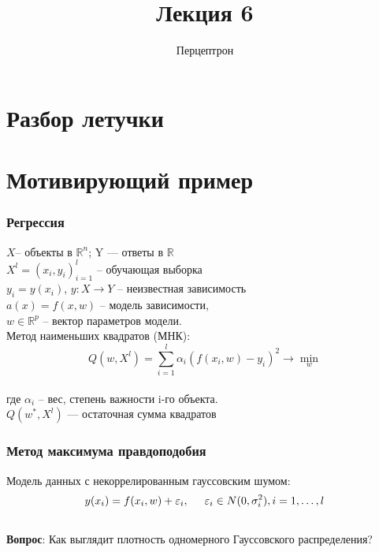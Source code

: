 \documentclass[10pt]{beamer}
\title{Лекция 6}
\subtitle{Перцептрон}
\begin{document}
\maketitle

\section{Разбор летучки}

\section{Мотивирующий пример}

\begin{frame}\frametitle{Регрессия}
$X$-- объекты в $\mathbb{R}^n$; Y — ответы в $\mathbb{R}$\\
$X^l = (x_i, y_i)_{i=1}^l$ -- обучающая выборка\\
$y_i = y(x_i)$,  $y : X \rightarrow Y$ -- неизвестная зависимость\\
\vspace{5mm}
$a(x) = f (x, w)$ -- модель зависимости,\\
$w \in \mathbb{R}^p$ -- вектор параметров модели.\\
\vspace{5mm}
Метод наименьших квадратов (МНК):\\
$$Q(w,X^l) = \sum\limits_{i=1}^l \alpha_i (f (x_i, w) - y_i)^2 \rightarrow \min\limits_{w}$$\\
где $\alpha_i$ -- вес, степень важности i-го объекта.\\
$Q(w^*,X^l)$ — остаточная сумма квадратов

\end{frame}

\begin{frame}\frametitle{Метод максимума правдоподобия}
Модель данных с некоррелированным гауссовским шумом:\\
$$y(x_i) = f (x_i, w) + \varepsilon_i, \hspace{5mm} \varepsilon_i \in N (0, \sigma_i^2), i = 1, \dots, l$$\\
\vspace{5mm}
\textbf{Вопрос}: Как выглядит плотность одномерного Гауссовского распределения?
\end{frame}
\end{document}
